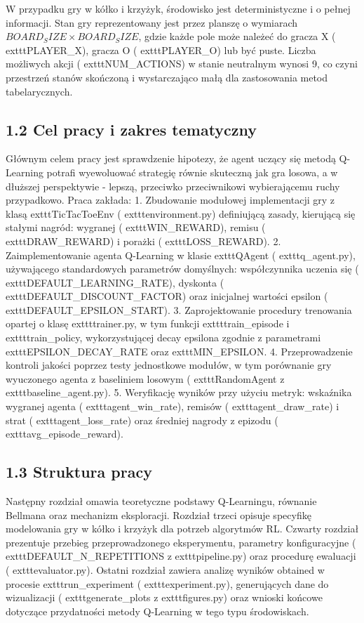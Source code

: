 \documentclass[conference]{IEEEtran}
\begin{document}
W przypadku gry w kółko i krzyżyk, środowisko jest deterministyczne i o pełnej informacji. Stan gry reprezentowany jest przez planszę o wymiarach $BOARD_SIZE \times BOARD_SIZE$, gdzie każde pole może należeć do gracza X (	exttt{PLAYER\_X}), gracza O (	exttt{PLAYER\_O}) lub być puste. Liczba możliwych akcji (	exttt{NUM\_ACTIONS}) w stanie neutralnym wynosi 9, co czyni przestrzeń stanów skończoną i wystarczająco małą dla zastosowania metod tabelarycznych.

\subsection{1.2 Cel pracy i zakres tematyczny}
Głównym celem pracy jest sprawdzenie hipotezy, że agent uczący się metodą Q-Learning potrafi wyewoluować strategię równie skuteczną jak gra losowa, a w dłuższej perspektywie - lepszą, przeciwko przeciwnikowi wybierającemu ruchy przypadkowo. Praca zakłada:
1. Zbudowanie modułowej implementacji gry z klasą 	exttt{TicTacToeEnv} (	exttt{environment.py}) definiującą zasady,
kierującą się stałymi nagród: wygranej (	exttt{WIN\_REWARD}), remisu (	exttt{DRAW\_REWARD}) i porażki (	exttt{LOSS\_REWARD}).
2. Zaimplementowanie agenta Q-Learning w klasie 	exttt{QAgent} (	exttt{q\_agent.py}), używającego standardowych parametrów domyślnych: współczynnika uczenia się (	exttt{DEFAULT\_LEARNING\_RATE}), dyskonta (	exttt{DEFAULT\_DISCOUNT\_FACTOR}) oraz inicjalnej wartości epsilon (	exttt{DEFAULT\_EPSILON\_START}).
3. Zaprojektowanie procedury trenowania opartej o klasę 	exttt{trainer.py}, w tym funkcji 	exttt{train\_episode} i 	exttt{train\_policy}, wykorzystującej decay epsilona zgodnie z parametrami 	exttt{EPSILON\_DECAY\_RATE} oraz 	exttt{MIN\_EPSILON}.
4. Przeprowadzenie kontroli jakości poprzez testy jednostkowe modułów, w tym porównanie gry wyuczonego agenta z baseliniem losowym (	exttt{RandomAgent} z 	exttt{baseline\_agent.py}).
5. Weryfikację wyników przy użyciu metryk: wskaźnika wygranej agenta (	exttt{agent\_win\_rate}), remisów (	exttt{agent\_draw\_rate}) i strat (	exttt{agent\_loss\_rate}) oraz średniej nagrody z epizodu (	exttt{avg\_episode\_reward}).

\subsection{1.3 Struktura pracy}
Następny rozdział omawia teoretyczne podstawy Q-Learningu, równanie Bellmana oraz mechanizm eksploracji. Rozdział trzeci opisuje specyfikę modelowania gry w kółko i krzyżyk dla potrzeb algorytmów RL. Czwarty rozdział prezentuje przebieg przeprowadzonego eksperymentu, parametry konfiguracyjne (	exttt{DEFAULT\_N\_REPETITIONS} z 	exttt{pipeline.py}) oraz procedurę ewaluacji (	exttt{evaluator.py}). Ostatni rozdział zawiera analizę wyników obtained w procesie 	exttt{run\_experiment} (	exttt{experiment.py}), generujących dane do wizualizacji (	exttt{generate\_plots} z 	exttt{figures.py}) oraz wnioski końcowe dotyczące przydatności metody Q-Learning w tego typu środowiskach.
\end{document}
